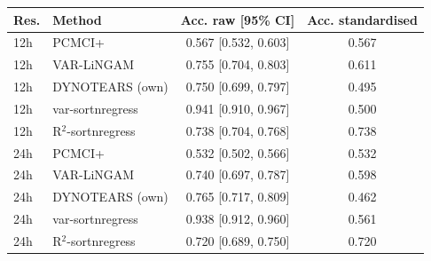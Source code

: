 \begin{tabular}{@{}llcc@{}}
\toprule
Res. & Method & Acc. raw [95\% CI] & Acc. standardised \\
\midrule
12h & PCMCI+ & 0.567 [0.532, 0.603] & 0.567 \\
12h & VAR-LiNGAM & 0.755 [0.704, 0.803] & 0.611 \\
12h & DYNOTEARS (own) & 0.750 [0.699, 0.797] & 0.495 \\
12h & var-sortnregress & 0.941 [0.910, 0.967] & 0.500 \\
12h & R$^2$-sortnregress & 0.738 [0.704, 0.768] & 0.738 \\
\midrule
24h & PCMCI+ & 0.532 [0.502, 0.566] & 0.532 \\
24h & VAR-LiNGAM & 0.740 [0.697, 0.787] & 0.598 \\
24h & DYNOTEARS (own) & 0.765 [0.717, 0.809] & 0.462 \\
24h & var-sortnregress & 0.938 [0.912, 0.960] & 0.561 \\
24h & R$^2$-sortnregress & 0.720 [0.689, 0.750] & 0.720 \\
\bottomrule
\end{tabular}
